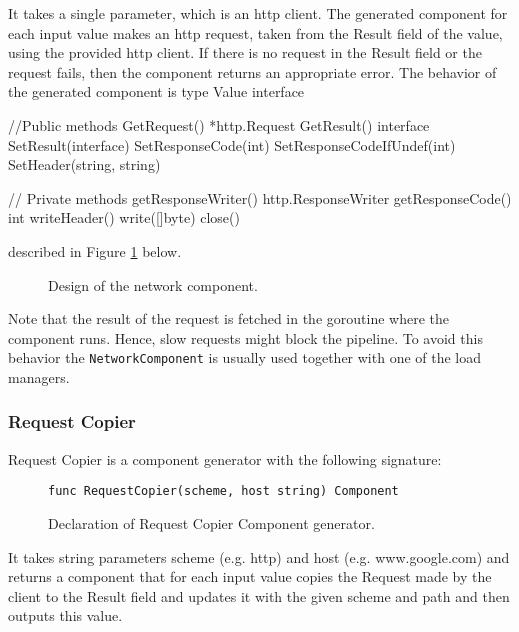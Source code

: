\documentclass[12pt,a4paper]{article}
\begin{document}
It takes a single parameter, which is an http client.
The generated component for each input value makes an http request,
taken from the Result field of the value, using the provided http client.
If there is no request in the Result field or the request fails, then
the component returns an appropriate error. The behavior of the generated 
component is type Value interface {
    //Public methods
    GetRequest() *http.Request
    GetResult() interface{}
    SetResult(interface{})
    SetResponseCode(int)
    SetResponseCodeIfUndef(int)
    SetHeader(string, string)

    // Private methods
    getResponseWriter() http.ResponseWriter
    getResponseCode() int
    writeHeader()
    write([]byte)
    close()
} described in Figure \ref{fig:networkComp}
below.

\begin{figure}[h]
\centering
{}
\caption[scale=1.0]{Design of the network component.}
\label{fig:networkComp}
\end{figure}

Note that the result of the request is fetched in the goroutine where the
component runs. Hence, slow requests might block the pipeline. To avoid
this behavior the \texttt{NetworkComponent} is usually used together with one
of the load managers.

\subsubsection{Request Copier}
Request Copier is a component generator with the following signature:
\begin{figure}[h]
\centering
\begin{lstlisting}
func RequestCopier(scheme, host string) Component
\end{lstlisting}
\caption[scale=1.0]{Declaration of Request Copier Component generator.}
\label{fig:RequestCopier}
\end{figure}
It takes string parameters scheme (e.g. http) and host (e.g. www.google.com) 
and returns a component that for each input value copies the Request made 
by the client to the Result field and updates it with the given scheme and 
path and then outputs this value.
\end{document}
